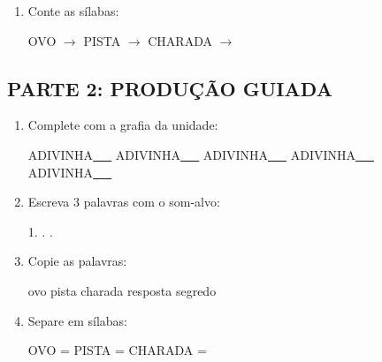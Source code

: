 \begin{exercicio}
\begin{enumerate}
  \item Conte as sílabas:
  \begin{center}
  OVO $\rightarrow$ \underline{\hspace{0.9cm}} \quad PISTA $\rightarrow$ \underline{\hspace{0.9cm}} \quad CHARADA $\rightarrow$ \underline{\hspace{0.9cm}}
  \end{center}

\end{enumerate}

\subsection*{PARTE 2: PRODUÇÃO GUIADA}

\begin{enumerate}[resume]

  \item Complete com a grafia da unidade:
  \begin{center}
  ADIVINHA\underline{~~~} \quad ADIVINHA\underline{~~~} \quad ADIVINHA\underline{~~~} \quad ADIVINHA\underline{~~~} \quad ADIVINHA\underline{~~~}
  \end{center}

  \item Escreva 3 palavras com o som-alvo:
  \begin{center}
  1. \underline{\hspace{3cm}} . \underline{\hspace{3cm}} . \underline{\hspace{3cm}}
  \end{center}

  \item Copie as palavras:
  \begin{center}
  ovo \quad pista \quad charada \quad resposta \quad segredo
  \end{center}

  \item Separe em sílabas:
  \begin{center}
  OVO = \underline{\hspace{1cm}} \underline{\hspace{1cm}} \quad PISTA = \underline{\hspace{1cm}} \underline{\hspace{1cm}} \quad CHARADA = \underline{\hspace{1cm}} \underline{\hspace{1cm}}
  \end{center}


\end{enumerate}
\end{exercicio}
